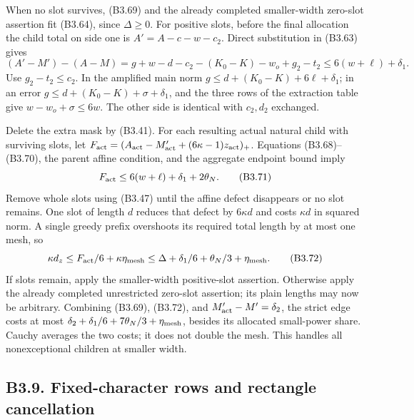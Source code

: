 \documentclass[11pt,a4paper]{article}
\begin{document}
When no slot survives, (B3.69) and the already completed smaller-width
zero-slot assertion fit (B3.64), since \(\Delta\ge0\). For positive
slots, before the final allocation the child total on side one is
\(A'=A-c-w-c_2\). Direct substitution in (B3.63) gives \[
(A'-M')-(A-M)
=g+w-d-c_2-(K_0-K)-w_o+g_2-t_2
\le6(w+\ell)+\delta_1.
\tag{B3.70}
\] Use \(g_2-t_2\le c_2\). In the amplified main norm
\(g\le d+(K_0-K)+6\ell+\delta_1\); in an error
\(g\le d+(K_0-K)+\sigma+\delta_1\), and the three rows of the extraction
table give \(w-w_o+\sigma\le6w\). The other side is identical with
\(c_2,\allowbreak{}d_2\) exchanged.

Delete the extra mask by (B3.41). For each resulting actual natural
child with surviving slots, let
\(F_{\rm act}=(A_{\rm act}-M'_{\rm act}+(6\kappa-1)z_{\rm act})_+\).
Equations (B3.68)--(B3.70), the parent affine condition, and the
aggregate endpoint bound imply \[
F_{\rm act}\le6(w+\ell)+\delta_1+2\theta_N.
\tag{B3.71}
\] Remove whole slots using (B3.47) until the affine defect disappears
or no slot remains. One slot of length \(d\) reduces that defect by
\(6\kappa d\) and costs \(\kappa d\) in squared norm. A single greedy
prefix overshoots its required total length by at most one mesh, so \[
\kappa d_z\le F_{\rm act}/6+\kappa\eta_{\rm mesh}
\le\Delta+\delta_1/6+\theta_N/3+\eta_{\rm mesh}.
\tag{B3.72}
\] If slots remain, apply the smaller-width positive-slot assertion.
Otherwise apply the already completed unrestricted zero-slot assertion;
its plain lengths may now be arbitrary. Combining (B3.69), (B3.72), and
\(M'_{\rm act}-M'=\delta_2\), the strict edge costs at most
\(\delta_2+\delta_1/6+7\theta_N/3+\eta_{\rm mesh}\), besides its
allocated small-power share. Cauchy averages the two costs; it does not
double the mesh. This handles all nonexceptional children at smaller
width.

\hypertarget{b3.9.-fixed-character-rows-and-rectangle-cancellation}{%
\subsection{B3.9. Fixed-character rows and rectangle
cancellation}\label{b3.9.-fixed-character-rows-and-rectangle-cancellation}}
\end{document}

